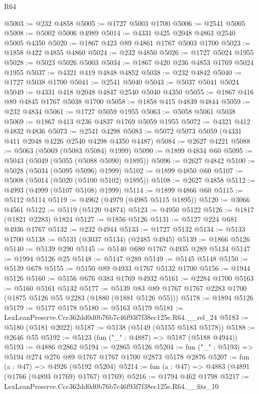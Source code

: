 \begin{lexlean}{R64}
\begin{coremodule}
@5003 := @232 @4858
@5005 := @1727 @5003 @1700
@5006 := @2541 @5005
@5008 := @5002 @5006 @4989
@5014 := @4331 @425 @2048 @4863 @2540 @5005 @4350
@5020 := @1867 @423 @89 @4861 @1767 @5003 @1700
@5023 := @1858 @422 @4855 @4860
@5024 := @232 @4850
@5026 := @1727 @5024 @1955
@5028 := @5023 @5026 @5003
@5034 := @1867 @420 @236 @4853 @1769 @5024 @1955
@5037 := @4321 @419 @4848 @4852
@5038 := @232 @4842
@5040 := @1727 @5038 @1700
@5041 := @2541 @5040
@5043 := @5037 @5041 @5024
@5049 := @4331 @418 @2048 @4847 @2540 @5040 @4350
@5055 := @1867 @416 @89 @4845 @1767 @5038 @1700
@5058 := @1858 @415 @4839 @4844
@5059 := @232 @4834
@5061 := @1727 @5059 @1955
@5063 := @5058 @5061 @5038
@5069 := @1867 @413 @236 @4837 @1769 @5059 @1955
@5072 := @4321 @412 @4832 @4836
@5073 := @2541 @4298
@5083 := @5072 @5073 @5059 (@4331 @411 @2048 @4226 @2540 @4298 @4350 @4487)
@5084 := @2627 @4221
@5088 := @5063 (@5069 (@5083 @5084) @1999)
@5090 := @1899 @4834 @60
@5095 := @5043 (@5049 (@5055 (@5088 @5090) @1895))
@5096 := @2627 @4842
@5100 := @5028 (@5034 (@5095 @5096) @1999)
@5102 := @1899 @4850 @60
@5107 := @5008 (@5014 (@5020 (@5100 @5102) @1895))
@5108 := @2627 @4858
@5112 := @4993 (@4999 (@5107 @5108) @1999)
@5114 := @1899 @4866 @60
@5115 := @5112 @5114
@5119 := @4962 (@4979 (@4985 @5115 @1895))
@5120 := @3066 @4561
@5122 := @5119 (@5120 @4874)
@5123 := @4950 @5122
@5126 := @1817 (@1821 @2283) @1824
@5127 := @1856 @5126
@5131 := @5127 @224 @681 @4936 @1767
@5132 := @232 @4944
@5133 := @1727 @5132
@5134 := @5133 @1700
@5138 := @5131 (@3037 @5134) (@2485 @4945)
@5139 := @1866 @5126
@5140 := @5139 @290
@5145 := @5140 @680 @1767 @4935 @289 @5134
@5147 := @1994 @5126 @25
@5148 := @5147 @289
@5149 := @5145 @5148
@5150 := @5139 @678
@5155 := @5150 @89 @4933 @1767 @5132 @1700
@5156 := @1944 @5126
@5160 := @5156 @676 @383 @1769 @4932
@5161 := @2284 @1700
@5163 := @5160 @5161 @5132
@5177 := @5139 @83 @89 @1767 @1767 @2283 @1700 (@1875 @5126 @55 @2283 (@1880 (@1881 @5126 @55)))
@5178 := @1894 @5126
@5179 := @5177 @5178
@5180 := @5163 @5179
@5181 := LexLeanPreserve.Ccc362dd0d0b76b7c46f93f7f38ec125e.R64.__rel_24
@5183 := @5180 (@5181 @2022)
@5187 := @5138 (@5149 (@5155 @5183 @5178))
@5188 := @2646 @55
@5192 := @5123 (fun ("_" : @4887) => @5187 (@5188 @4944))
@5193 := @4886 @2862
@5194 := @2865 @5126
@5204 := fun ("_" : @5193) => @5194 @274 @276 @89 @1767 @1767 @1700 @2873 @5178 @2876
@5207 := fun (a : @47) => @4926 (@5192 @5204)
@5214 := fun (a : @47) => @4883 (@4891 (@1766 (@4893 @1769) @1767) @1769)
@5216 := @1794 @462 @1798
@5217 := LexLeanPreserve.Ccc362dd0d0b76b7c46f93f7f38ec125e.R64.__fits_10

\end{coremodule}
\end{lexlean}
